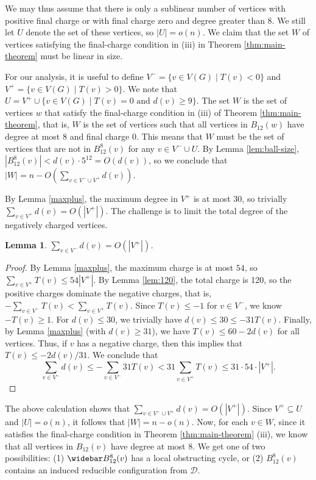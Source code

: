 \documentclass[10pt,a4paper]{article}
\newtheorem{lem}[thm]{Lemma}
\renewcommand{\bar}{\widebar}
\newcommand{\carsten}[1]{\textbf{\textcolor{orange}{{C: } #1}}}
\begin{document}
We may thus assume that there is only a sublinear number of vertices with positive final charge or with final charge zero and degree greater than 8. We still let $U$ denote the set of these vertices, so $|U|=o(n)$. We claim that the
set $W$ of vertices satisfying the final-charge condition in
(iii) in Theorem \ref{thm:main-theorem} must be linear in size.

For our analysis, it is useful to define
$V^- = \{v\in V(G)\mid T(v)<0\}$ and $V^+ = \{v\in V(G)\mid T(v)>0\}$. We note that
$U=V^+\cup \{v\in V(G)\mid T(v)=0 \textrm{ and } d(v)\ge9\}$.
The set $W$ is the set of vertices $w$ that satisfy 
the final-charge condition in (iii) of Theorem \ref{thm:main-theorem}, that is, $W$ is the set of vertices such that all vertices in $B_{12}(w)$
have degree at most 8 and final charge 0.
This means that $W$ must be the set of vertices that
are not in $B^8_{12}(v)$ for any $v\in V^-\cup U$.
By Lemma \ref{lem:ball-size}, $|B^8_{12}(v)| < d(v)\cdot 5^{12}=O(d(v))$, so we conclude
that $|W|=n-O(\sum_{v\in V^-\cup V^+} d(v))$. 

By Lemma \ref{maxplus}, the maximum degree in $V^+$ is at most 30, so trivially $\sum_{v\in V^+} d(v)=O(|V^+|)$. The challenge is to limit the total degree of the negatively charged vertices.

\begin{lem}
    $\sum_{v\in V^-} d(v)=O(|V^+|)$.
\end{lem}

\begin{proof}
By Lemma \ref{maxplus}, the maximum charge is at most $54$, so 
$\sum_{v\in V^+} T(v)\leq 54|V^+|$. By Lemma \ref{lem:120}, the total charge is 120, so the positive charges dominate the negative charges, that is, $-\sum_{v\in V^-}T(v)<\sum_{v\in V^+} T(v)$. 
Since $T(v) \le -1$ for $v \in V^-$, we know $-T(v) \ge 1$. For $d(v) \le 30$, we trivially have $d(v) \le 30 \le -31 T(v)$.
Finally, by Lemma \ref{maxplus} (with $d(v) \ge 31$), we have
$T(v)\leq 60-2d(v)$ for all vertices. Thus, if $v$ has a negative charge, then this implies that $T(v)\leq -2d(v)/31$. We conclude that
\[
   \sum_{v\in V^{-}}d(v)\le-\sum_{v\in V^{-}} 31 T(v) < 31 \sum_{v\in V^{+}}T(v)\le 31\cdot54\cdot|V^{+}|.\]
\end{proof}

The above calculation shows that $\sum_{v\in V^-\cup V^+} d(v) = O(|V^+|)$. 
Since $V^+\subseteq U$ and $|U|=o(n)$, it follows that $|W|=n-o(n)$. Now, for each $v\in W$, since it satisfies the final-charge condition in 
Theorem \ref{thm:main-theorem} (iii), we know that all vertices in $B_{12}(v)$
have degree at most $8$. We get one of two possibilities: (1) $\bar B^8_{12}(v)$ has a local obstructing cycle, 
or (2) $B^8_{12}(v)$ contains an induced reducible configuration from $\mathcal{D}$. 
\end{document}
